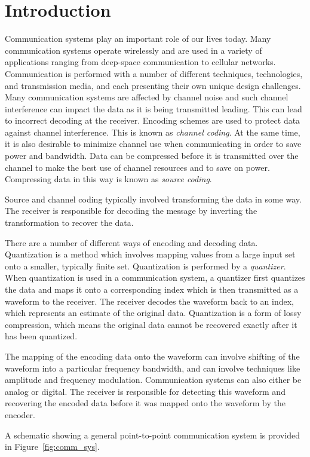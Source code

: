 \documentclass[10pt]{article}
\begin{document}
\section{Introduction}
Communication systems play an important role of our lives today. Many communication systems operate wirelessly and are used in a variety of applications ranging from deep-space communication to cellular networks. Communication is performed with a number of different techniques, technologies, and transmission media, and each presenting their own unique design challenges. Many communication systems are affected by channel noise and such channel interference can impact the data as it is being transmitted leading. This can lead to incorrect decoding at the receiver. Encoding schemes are used to protect data against channel interference. This is known as \emph{channel coding}. At the same time, it is also desirable to minimize channel use when communicating in order to save power and bandwidth. Data can be compressed before it is transmitted over the channel to make the best use of channel resources and to save on power. Compressing data in this way is known as \emph{source coding}.

Source and channel coding typically involved transforming the data in some way. The receiver is responsible for decoding the message by inverting the transformation to recover the data.

There are a number of different ways of encoding and decoding data. Quantization is a method which involves mapping values from a large input set onto a smaller, typically finite set. Quantization is performed by a \emph{quantizer}. When quantization is used in a communication system, a quantizer first quantizes the data and maps it onto a corresponding index which is then transmitted as a waveform to the receiver. The receiver decodes the waveform back to an index, which represents an estimate of the original data. Quantization is a form of lossy compression, which means the original data cannot be recovered exactly after it has been quantized.

The mapping of the encoding data onto the waveform can involve shifting of the waveform into a particular frequency bandwidth, and can involve techniques like amplitude and frequency modulation. Communication systems can also either be analog or digital. The receiver is responsible for detecting this waveform and recovering the encoded data before it was mapped onto the waveform by the encoder.

A schematic showing a general point-to-point communication system is provided in Figure~\ref{fig:comm_sys}.
\end{document}
